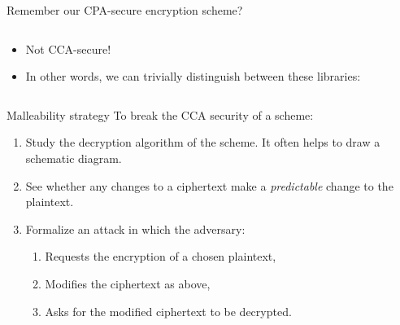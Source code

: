 \documentclass[aspectratio=169, lualatex, handout]{beamer}
\begin{document}
\begin{frame}{Remember our CPA-secure encryption scheme?}
	\begin{columns}[c]
		\begin{column}{0.3\textwidth}
			\begin{itemize}
				\item Not CCA-secure!
				\item In other words, we can trivially distinguish between these libraries:
			\end{itemize}
		\end{column}
		\begin{column}{0.7\textwidth}
		\end{column}
	\end{columns}
\end{frame}

\begin{frame}{Malleability strategy}
	To break the CCA security of a scheme:
	\begin{enumerate}
		\item Study the decryption algorithm of the scheme. It often helps to draw a schematic diagram.
		\item See whether any changes to a ciphertext make a \textit{predictable} change to the plaintext.
		\item Formalize an attack in which the adversary:
		      \begin{enumerate}
			      \item Requests the encryption of a chosen plaintext,
			      \item Modifies the ciphertext as above,
			      \item Asks for the modified ciphertext to be decrypted.
		      \end{enumerate}
	\end{enumerate}
\end{frame}
\end{document}
